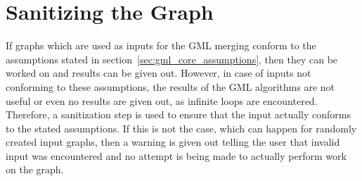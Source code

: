 \documentclass[a4paper,12pt,twoside,BCOR=10mm]{scrbook}
\begin{document}
\section{Sanitizing the Graph}

If graphs which are used as inputs for the GML merging conform to the assumptions
stated in section~\ref{sec:gml_core_assumptions},
then they can be worked on and results can be given out.
However, in case of inputs not conforming to these assumptions, the results of the GML algorithms
are not useful or even no results are given out, as infinite loops are encountered.
Therefore, a sanitization step is used to ensure that the input actually conforms to the
stated assumptions. If this is not the case, which can happen for randomly created input graphs,
then a warning is given out telling the user that invalid input was encountered and
no attempt is being made to actually perform work on the graph.
\end{document}
